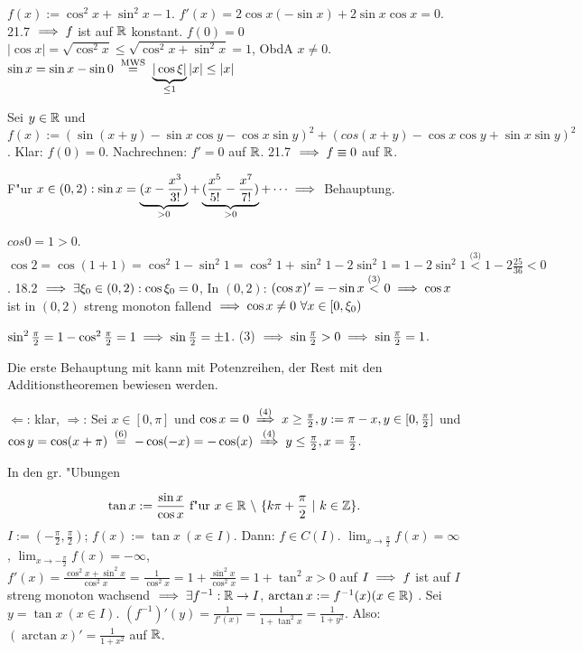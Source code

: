 \documentclass[a4paper,twoside,DIV15,BCOR12mm]{scrbook}
\begin{document}
\begin{beweise}
\item $f(x):=\cos^2 x + \sin^2 x -1$. $f'(x)=2\cos x(-\sin x)+2\sin x\cos x=0$. 21.7 $\implies f$ ist auf $\mathbb{R}$ konstant. $f(0)=0$ $|\cos x|=\sqrt{\cos^2 x} \le \sqrt{\cos^2 x + \sin^2 x}=1$, ObdA $x\ne0$. $\sin x=\sin x-\sin 0 \gleichnach{MWS} \underbrace{|\cos \xi|}_{\le 1}|x| \le |x|$
\item Sei $y \in \mathbb{R}$ und $f(x):=(\sin(x+y)-\sin x \cos y - \cos x \sin y)^2 + (cos(x+y)-\cos x \cos y + \sin x \sin y)^2$. Klar: $f(0)=0$. Nachrechnen: $f'=0$ auf $\mathbb{R}$. 21.7 $\implies f\equiv 0$ auf $\mathbb{R}$.
\item F"ur $x\in(0,2): \sin x = \underbrace{(x-\frac{x^3}{3!})}_{>0}+\underbrace{(\frac{x^5}{5!}-\frac{x^7}{7!})}_{>0}+\cdots \implies$ Behauptung.
\item $cos 0 = 1> 0$. $\cos 2 = \cos(1+1) = \cos^2 1 - \sin^2 1=\cos^2 1 + \sin^2 1 - 2\sin^2 1 = 1-2\sin^2 1 \overset{\text{(3)}}{<} 1-2\frac{25}{36}<0$. 18.2 $\implies \exists \xi_0 \in (0, 2): \cos \xi_0=0$, In $(0,2)$: $(\cos x)'=-\sin x \overset{\text{(3)}}{<} 0 \implies \cos x$ ist in $(0,2)$ streng monoton fallend $\folgt \cos x \ne 0 \ \forall x \in [0, \xi_0)$
\item $\sin^2\frac{\pi}{2}=1-\cos^2\frac{\pi}{2}=1\implies\sin\frac{\pi}{2}=\pm 1$. (3) $\implies\sin\frac{\pi}{2}>0\implies\sin\frac{\pi}{2}=1$.
\item Die erste Behauptung mit kann mit Potenzreihen, der Rest mit den Additionstheoremen bewiesen werden.
\item \glqq$\Leftarrow$\grqq: klar, \glqq$\Rightarrow$\grqq: Sei $x\in[0, \pi]$ und $\cos x = 0 \folgtnach{(4)} x\ge\frac{\pi}{2}, y:=\pi-x, y \in [0, \frac{\pi}{2}]$ und $\cos y=\cos(x+\pi)\gleichnach{(6)}-\cos(-x)=-\cos(x)\folgtnach{(4)}y\le\frac{\pi}{2}, x=\frac{\pi}{2}$.
\item In den gr. "Ubungen
\end{beweise}

\begin{wichtigedefinition}[Tangens]
$$\tan x:=\frac{\sin x}{\cos x}\ \text{f"ur}\ x \in \MdR\ \backslash\ \{k\pi+\frac{\pi}{2}\ |\ k \in \MdZ\}.$$ $I:=(-\frac{\pi}{2}, \frac{\pi}{2})$; $f(x):=\tan x\ (x\in I)$. Dann: $f\in C(I)$. $
\displaystyle\lim_{x\to\frac{\pi}{2}}{f(x)}=\infty$, $\displaystyle\lim_{x\to-\frac{\pi}{2}}{f(x)}=-\infty$, $f'(x)=\frac{\cos^2 x + \sin^2 x}{\cos^2 x}=\frac{1}{\cos^2 x}=1+\frac{\sin^2 x}{\cos^2 x}=1+\tan^2 x>0$ auf $I \implies f$ ist auf $I$ streng monoton wachsend $\implies \exists f^{-1}: \mathbb{R} \to I$, $\arctan x:=f^{-1}(x) (x \in \mathbb{R})$ . Sei $y=\tan x\ (x \in I)$. $(f^{-1})'(y)=\frac{1}{f'(x)}=\frac{1}{1+\tan^2 x}=\frac{1}{1+y^2}$. Also: $(\arctan x)'=\frac{1}{1+x^2}$ auf $\mathbb{R}$.
\end{wichtigedefinition}
\end{document}
